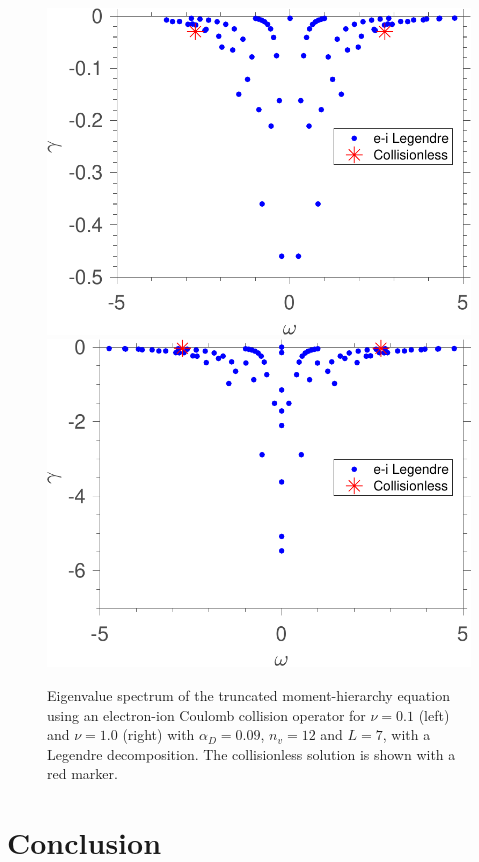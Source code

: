 \begin{figure}
    \centering
    \includegraphics[width=.49\textwidth]{images/LegendreEigenvalues_nu_0_1nv_12_Lmax_7-eps-converted-to.pdf}
    \includegraphics[width=.49\textwidth]{images/LegendreEigenvalues_nu_1_0nv_12_Lmax_7-eps-converted-to.pdf}
    \caption{Eigenvalue spectrum of the truncated moment-hierarchy equation using an electron-ion Coulomb collision operator for $\nu=0.1$ (left) and $\nu=1.0$ (right) with $\alpha_D=0.09$, $n_v=12$ and $L=7$, with a Legendre decomposition. The collisionless solution is shown with a red marker.}
    \label{fig:eirootsLe}
\end{figure}

\section{Conclusion}
\label{sec:conclusions}

